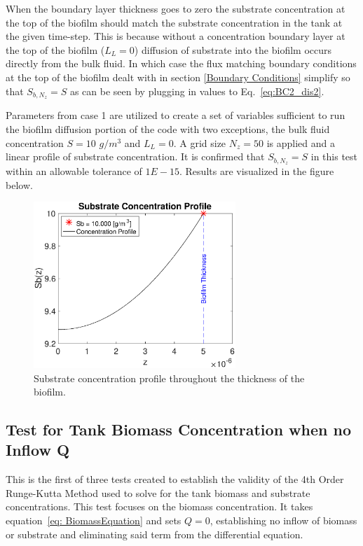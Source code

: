 \documentclass[letterpaper, twoside]{article}
\numberwithin{equation}{section}
\begin{document}
When the boundary layer thickness goes to zero the substrate concentration at the top of the biofilm should match the substrate concentration in the tank at the given time-step. This is because without a concentration boundary layer at the top of the biofilm ($L_L=0$) diffusion of substrate into the biofilm occurs directly from the bulk fluid. In which case the flux matching boundary conditions at the top of the biofilm dealt with in section \ref{Boundary Conditions} simplify so that $S_{b,N_z}=S$ as can be seen by plugging in values to Eq.~\ref{eq:BC2_dis2}.

Parameters from case 1 are utilized to create a set of variables sufficient to run the biofilm diffusion portion of the code with two exceptions, the bulk fluid concentration $S=10$ $g/m^3$ and $L_L=0$. A grid size $N_z=50$ is applied and a linear profile of substrate concentration. It is confirmed that $S_{b,N_z}=S$ in this test within an allowable tolerance of $1E-15$. Results are visualized in the figure below.

\begin{figure}[H]
  \centering
  \includegraphics[read=eps, width=3in]{BoundaryLayer_Figure1.eps}
  \caption{Substrate concentration profile throughout the thickness of the biofilm.}
\end{figure}

\subsection{Test for Tank Biomass Concentration when no Inflow Q}
This is the first of three tests created to establish the validity of the 4th Order Runge-Kutta Method used to solve for the tank biomass and substrate concentrations. This test focuses on the biomass concentration. It takes equation~\ref{eq: BiomassEquation} and sets $Q=0$, establishing no inflow of biomass or substrate and eliminating said term from the differential equation. 
\end{document}

